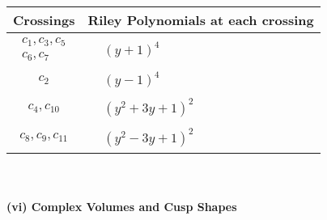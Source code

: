 \documentclass[1p]{elsarticle_modified}
\theoremstyle{definition}
\begin{document}
\begin{tabular}{m{50pt}|m{274pt}}
Crossings & \hspace{64pt}Riley Polynomials at each crossing \\
\hline $$\begin{aligned}c_{1},c_{3},c_{5}\\c_{6},c_{7}\end{aligned}$$&$\begin{aligned}
&(y+1)^4
\end{aligned}$\\
\hline $$\begin{aligned}c_{2}\end{aligned}$$&$\begin{aligned}
&(y-1)^4
\end{aligned}$\\
\hline $$\begin{aligned}c_{4},c_{10}\end{aligned}$$&$\begin{aligned}
&(y^2+3 y+1)^2
\end{aligned}$\\
\hline $$\begin{aligned}c_{8},c_{9},c_{11}\end{aligned}$$&$\begin{aligned}
&(y^2-3 y+1)^2
\end{aligned}$\\
\hline
\end{tabular}\\~\\
\newpage\flushleft \textbf{(vi) Complex Volumes and Cusp Shapes}
\end{document}
